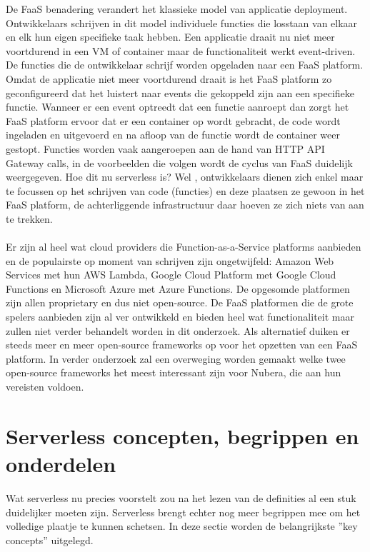 De FaaS benadering verandert het klassieke model van applicatie deployment. Ontwikkelaars schrijven in dit model individuele functies die losstaan van elkaar en elk hun eigen specifieke taak hebben. Een applicatie draait nu niet meer voortdurend in een VM of container maar de functionaliteit werkt event-driven. De functies die de ontwikkelaar schrijf worden opgeladen naar een FaaS platform. Omdat de applicatie niet meer voortdurend draait is het FaaS platform zo geconfigureerd dat het luistert naar events die gekoppeld zijn aan een specifieke functie. Wanneer er een event optreedt dat een functie aanroept dan zorgt het FaaS platform ervoor dat er een container op wordt gebracht, de code wordt ingeladen en uitgevoerd en na afloop van de functie wordt de container weer gestopt. Functies worden vaak aangeroepen aan de hand van HTTP API Gateway calls, in de voorbeelden die volgen wordt de cyclus van FaaS duidelijk weergegeven. Hoe dit nu serverless is? Wel , ontwikkelaars dienen zich enkel maar te focussen op het schrijven van code (functies) en deze plaatsen ze gewoon in het FaaS platform, de achterliggende infrastructuur daar hoeven ze zich niets van aan te trekken.\autocite{Roberts2017}
\\\\
Er zijn al heel wat cloud providers die Function-as-a-Service platforms aanbieden en de populairste op moment van schrijven zijn ongetwijfeld: Amazon Web Services met hun AWS Lambda, Google Cloud Platform met Google Cloud Functions en Microsoft Azure met Azure Functions. De opgesomde platformen zijn allen proprietary en dus niet open-source. De FaaS platformen die de grote spelers aanbieden zijn al ver ontwikkeld en bieden heel wat functionaliteit maar zullen niet verder behandelt worden in dit onderzoek. Als alternatief duiken er steeds meer en meer open-source frameworks op voor het opzetten van een FaaS platform. In verder onderzoek zal een overweging worden gemaakt welke twee open-source frameworks het meest interessant zijn voor Nubera, die aan hun vereisten voldoen.

\section{Serverless concepten, begrippen en onderdelen}
Wat serverless nu precies voorstelt zou na het lezen van de definities al een stuk duidelijker moeten zijn. Serverless brengt echter nog meer begrippen mee om het volledige plaatje te kunnen schetsen. In deze sectie worden de belangrijkste ''key concepts'' uitgelegd.


